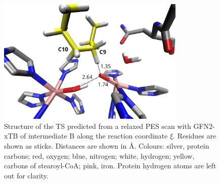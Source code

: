\begin{figure}[htbp]
    \centering
    \includegraphics[width=0.8\textwidth]{Figures/new_scan_ts.png}
    \caption{Structure of the TS predicted from a relaxed PES scan with GFN2-xTB of intermediate B along the reaction coordinate $\xi$. Residues are shown as sticks. Distances are shown in Å. Colours: silver, protein carbons; red, oxygen; blue, nitrogen; white, hydrogen; yellow, carbons of stearoyl-CoA; pink, iron. Protein hydrogen atoms are left out for clarity.}
    \label{fig:xtb_scan_ts}
\end{figure}

